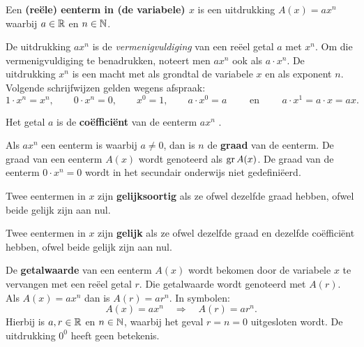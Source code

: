 \documentclass{ximera}
\begin{document}
\begin{definition} 
Een \textbf{(reële) eenterm in (de variabele) \(x\)} is een uitdrukking \(A(x) = ax^n\) waarbij \(a \in \mathbb{R}\) en \(n \in \mathbb{N}\). 

De uitdrukking \(ax^n\) is de \textit{ vermenigvuldiging} van een reëel getal \(a\) met \(x^n\). Om die vermenigvuldiging te benadrukken, noteert men \(ax^n\)  ook als \(a \cdot x^n\). De uitdrukking \(x^n\) is een macht met als grondtal de variabele \(x\) en als exponent \(n\). Volgende schrijfwijzen gelden wegens afspraak:
\[
1\cdot x^n = x^n, \qquad
0\cdot x^n = 0, \qquad  
x^0 = 1, \qquad 
a\cdot x^0 = a \qquad \text{ en } \qquad 
a\cdot x^1 = a \cdot x = ax.
\]

Het getal \(a\) is de \textbf{coëfficiënt} van de eenterm \(ax^n\) .

Als \(ax^n\) een eenterm is waarbij \(a \neq 0\), dan is \(n\) de \textbf{graad} van de eenterm. De graad van een eenterm \(A(x)\) wordt genoteerd als \(\operatorname{gr} A(x)\). De graad van de eenterm \(0\cdot x^n = 0\) wordt in het secundair onderwijs niet gedefiniëerd.


Twee eentermen in \(x\) zijn \textbf{gelijksoortig} als ze ofwel dezelfde graad hebben, ofwel beide gelijk zijn aan nul.

Twee eentermen in \(x\) zijn \textbf{gelijk} als ze ofwel dezelfde graad en dezelfde coëfficiënt hebben, ofwel beide gelijk zijn aan nul.


De \textbf{getalwaarde} van een eenterm \(A(x)\) wordt bekomen door de variabele \(x\) te vervangen met een reëel getal \(r\). Die getalwaarde wordt genoteerd met \(A(r)\). Als \(A(x) = ax^n\) dan is \(A(r) = ar^n\). In symbolen:
\[
A(x) = ax^n \quad \Rightarrow \quad A(r) = a r^n.
\]
Hierbij is \(a,r \in \mathbb{R}\) en \(n \in \mathbb{N}\), waarbij het geval \(r = n = 0\) uitgesloten wordt. De uitdrukking \(0^0\) heeft geen betekenis.


\end{definition} 


\end{document}
